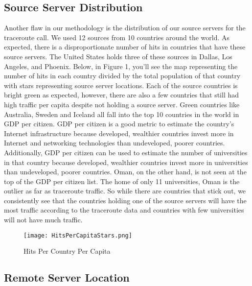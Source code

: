 \documentclass{sigcomm-alternate}
\begin{document}
\subsection{Source Server Distribution}
	Another flaw in our methodology is the distribution of our source servers for the traceroute call. We used 12 sources from 10 countries around the world. As expected, there is a disproportionate number of hits in countries that have these source servers. The United States holds three of these sources in Dallas, Los Angeles, and Phoenix. Below, in Figure 1, you’ll see the map representing the number of hits in each country divided by the total population of that country with stars representing source server locations. Each of the source countries is bright green as expected, however, there are also a few countries that still had high traffic per capita despite not holding a source server. Green countries like Australia, Sweden and Iceland all fall into the top 10 countries in the world in GDP per citizen. GDP per citizen is a good metric to estimate the country’s Internet infrastructure because developed, wealthier countries invest more in Internet and networking technologies than undeveloped, poorer countries. Additionally, GDP per citizen can be used to estimate the number of universities in that country because developed, wealthier countries invest more in universities than undeveloped, poorer countries. Oman, on the other hand, is not seen at the top of the GDP per citizen list. The home of only 11 universities, Oman is the outlier as far as traceroute traffic. So while there are countries that stick out, we consistently see that the countries holding one of the source servers will have the most traffic according to the traceroute data and countries with few universities will not have much traffic. 

	
\begin{figure}[h!]
  \caption{Hits Per Country Per Capita}
  \centering
    \texttt{[image: HitsPerCapitaStars.png]}
\end{figure}

\subsection{Remote Server Location}
\end{document}
